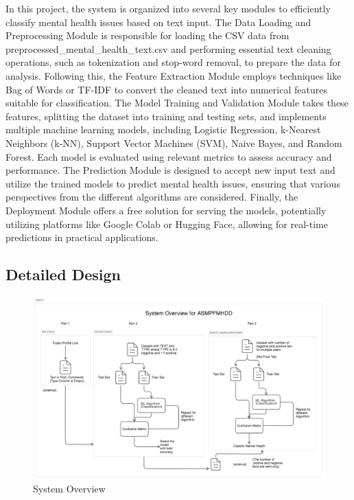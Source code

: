 \noindent
In this project, the system is organized into several key modules to efficiently classify mental health issues based on text input. The Data Loading and Preprocessing Module is responsible for loading the CSV data from preprocessed\_mental\_health\_text.csv and performing essential text cleaning operations, such as tokenization and stop-word removal, to prepare the data for analysis. Following this, the Feature Extraction Module employs techniques like Bag of Words or TF-IDF to convert the cleaned text into numerical features suitable for classification. The Model Training and Validation Module takes these features, splitting the dataset into training and testing sets, and implements multiple machine learning models, including Logistic Regression, k-Nearest Neighbors (k-NN), Support Vector Machines (SVM), Naive Bayes, and Random Forest. Each model is evaluated using relevant metrics to assess accuracy and performance. The Prediction Module is designed to accept new input text and utilize the trained models to predict mental health issues, ensuring that various perspectives from the different algorithms are considered. Finally, the Deployment Module offers a free solution for serving the models, potentially utilizing platforms like Google Colab or Hugging Face, allowing for real-time predictions in practical applications.

\subsection{Detailed Design}
\begin{figure}[h!]  
    \centering
    \includegraphics[width=1.0\textwidth]{Images/System Overview.png}  
    \caption{System Overview}
    \label{System Overview}  %
\end{figure}

